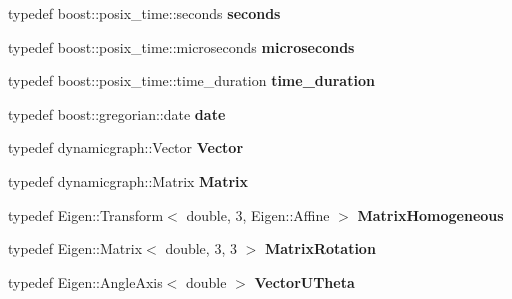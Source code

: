 \begin{DoxyCompactItemize}
\item 
typedef boost\+::posix\+\_\+time\+::seconds {\bfseries seconds}\hypertarget{namespacedynamic__graph_a6b06a10863ed1b2411191a895621dbb0}{}\label{namespacedynamic__graph_a6b06a10863ed1b2411191a895621dbb0}

\item 
typedef boost\+::posix\+\_\+time\+::microseconds {\bfseries microseconds}\hypertarget{namespacedynamic__graph_a4244ef24ba8efe2112a5535fd562e8b4}{}\label{namespacedynamic__graph_a4244ef24ba8efe2112a5535fd562e8b4}

\item 
typedef boost\+::posix\+\_\+time\+::time\+\_\+duration {\bfseries time\+\_\+duration}\hypertarget{namespacedynamic__graph_a4be0df79b9608a71968778c85d4a5f25}{}\label{namespacedynamic__graph_a4be0df79b9608a71968778c85d4a5f25}

\item 
typedef boost\+::gregorian\+::date {\bfseries date}\hypertarget{namespacedynamic__graph_a1a7a95fd96c4e7f1b829260880f14d91}{}\label{namespacedynamic__graph_a1a7a95fd96c4e7f1b829260880f14d91}

\item 
typedef dynamicgraph\+::\+Vector {\bfseries Vector}\hypertarget{namespacedynamic__graph_a2df237966b015fea47c58c7778cc9a73}{}\label{namespacedynamic__graph_a2df237966b015fea47c58c7778cc9a73}

\item 
typedef dynamicgraph\+::\+Matrix {\bfseries Matrix}\hypertarget{namespacedynamic__graph_a58a622fc51830acb132d3a3f18115374}{}\label{namespacedynamic__graph_a58a622fc51830acb132d3a3f18115374}

\item 
typedef Eigen\+::\+Transform$<$ double, 3, Eigen\+::\+Affine $>$ {\bfseries Matrix\+Homogeneous}\hypertarget{namespacedynamic__graph_a1cf832cafc093c1600db8cc4436661bb}{}\label{namespacedynamic__graph_a1cf832cafc093c1600db8cc4436661bb}

\item 
typedef Eigen\+::\+Matrix$<$ double, 3, 3 $>$ {\bfseries Matrix\+Rotation}\hypertarget{namespacedynamic__graph_a50d1b342105103d3078687b78d5e8197}{}\label{namespacedynamic__graph_a50d1b342105103d3078687b78d5e8197}

\item 
typedef Eigen\+::\+Angle\+Axis$<$ double $>$ {\bfseries Vector\+U\+Theta}\hypertarget{namespacedynamic__graph_aabaea0c174dde41c755e8d3fb6d23caa}{}\label{namespacedynamic__graph_aabaea0c174dde41c755e8d3fb6d23caa}


\end{DoxyCompactItemize}
